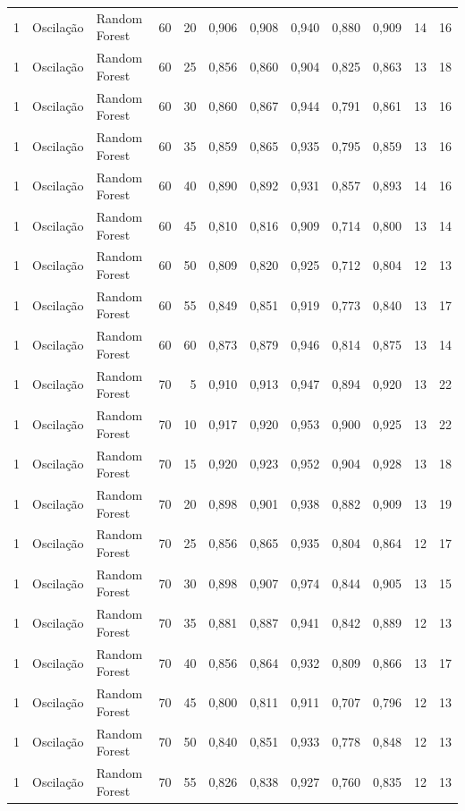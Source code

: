 \begin{longtable}{@{}rllrrrrrrrrr@{}}
1 & Oscilação & Random Forest & 60 & 20 & 0,906 & 0,908 & 0,940 & 0,880 & 0,909 & 14 & 16 \\
1 & Oscilação & Random Forest & 60 & 25 & 0,856 & 0,860 & 0,904 & 0,825 & 0,863 & 13 & 18 \\
1 & Oscilação & Random Forest & 60 & 30 & 0,860 & 0,867 & 0,944 & 0,791 & 0,861 & 13 & 16 \\
1 & Oscilação & Random Forest & 60 & 35 & 0,859 & 0,865 & 0,935 & 0,795 & 0,859 & 13 & 16 \\
1 & Oscilação & Random Forest & 60 & 40 & 0,890 & 0,892 & 0,931 & 0,857 & 0,893 & 14 & 16 \\
1 & Oscilação & Random Forest & 60 & 45 & 0,810 & 0,816 & 0,909 & 0,714 & 0,800 & 13 & 14 \\
1 & Oscilação & Random Forest & 60 & 50 & 0,809 & 0,820 & 0,925 & 0,712 & 0,804 & 12 & 13 \\
1 & Oscilação & Random Forest & 60 & 55 & 0,849 & 0,851 & 0,919 & 0,773 & 0,840 & 13 & 17 \\
1 & Oscilação & Random Forest & 60 & 60 & 0,873 & 0,879 & 0,946 & 0,814 & 0,875 & 13 & 14 \\
1 & Oscilação & Random Forest & 70 & 5 & 0,910 & 0,913 & 0,947 & 0,894 & 0,920 & 13 & 22 \\
1 & Oscilação & Random Forest & 70 & 10 & 0,917 & 0,920 & 0,953 & 0,900 & 0,925 & 13 & 22 \\
1 & Oscilação & Random Forest & 70 & 15 & 0,920 & 0,923 & 0,952 & 0,904 & 0,928 & 13 & 18 \\
1 & Oscilação & Random Forest & 70 & 20 & 0,898 & 0,901 & 0,938 & 0,882 & 0,909 & 13 & 19 \\
1 & Oscilação & Random Forest & 70 & 25 & 0,856 & 0,865 & 0,935 & 0,804 & 0,864 & 12 & 17 \\
1 & Oscilação & Random Forest & 70 & 30 & 0,898 & 0,907 & 0,974 & 0,844 & 0,905 & 13 & 15 \\
1 & Oscilação & Random Forest & 70 & 35 & 0,881 & 0,887 & 0,941 & 0,842 & 0,889 & 12 & 13 \\
1 & Oscilação & Random Forest & 70 & 40 & 0,856 & 0,864 & 0,932 & 0,809 & 0,866 & 13 & 17 \\
1 & Oscilação & Random Forest & 70 & 45 & 0,800 & 0,811 & 0,911 & 0,707 & 0,796 & 12 & 13 \\
1 & Oscilação & Random Forest & 70 & 50 & 0,840 & 0,851 & 0,933 & 0,778 & 0,848 & 12 & 13 \\
1 & Oscilação & Random Forest & 70 & 55 & 0,826 & 0,838 & 0,927 & 0,760 & 0,835 & 12 & 13 \\

\end{longtable}
